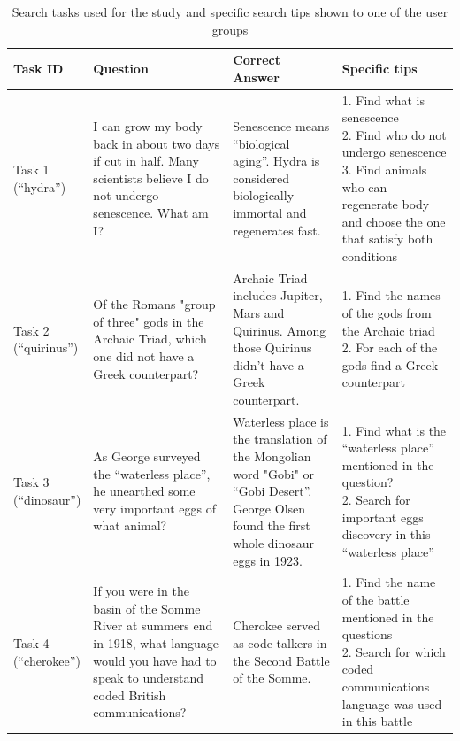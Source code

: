\documentclass{sig-alternate}
\begin{document}
\begin{table}[tbh]
\centering
\caption{Search tasks used for the study and specific search tips shown to one of the user groups}
\label{table:tasks}
\begin{tabular}{|p{1.55cm}|p{4.5cm}|p{4.2cm}|p{6.0cm}|} \hline
Task ID & Question & Correct Answer & Specific tips \\ \hline
\parbox[t]{1cm}{Task 1\\(``hydra'')} & I can grow my body back in about two days if cut in half. Many scientists believe I do not undergo senescence. What am I? & Senescence means ``biological aging''. Hydra is considered biologically immortal and regenerates fast. & \parbox[t]{6cm}{
1. Find what is senescence\\
2. Find who do not undergo senescence\\
3. Find animals who can regenerate body and choose the one that satisfy both conditions} \\ \hline
\parbox[t]{1cm}{Task 2\\(``quirinus'')} & Of the Romans "group of three" gods in the Archaic Triad, which one did not have a Greek counterpart? & Archaic Triad includes Jupiter, Mars and Quirinus. Among those Quirinus didn't have a Greek counterpart. &
\parbox[t]{6cm}{
1. Find the names of the gods from the Archaic triad\\
2. For each of the gods find a Greek counterpart
}\\ \hline
\parbox[t]{1cm}{Task 3\\(``dinosaur'')} & As George surveyed the ``waterless place'', he unearthed some very important eggs of what animal? & Waterless place is the translation of the Mongolian word "Gobi" or ``Gobi Desert''. George Olsen found the first whole dinosaur eggs in 1923. & \parbox[t]{6cm}{
1. Find what is the ``waterless place'' mentioned in the question?\\
2. Search for important eggs discovery in this ``waterless place''}\\ \hline
\parbox[t]{1cm}{Task 4\\(``cherokee'')} & If you were in the basin of the Somme River at summers end in 1918, what language would you have had to speak to understand coded British communications? & Cherokee served as code talkers in the Second Battle of the Somme. & \parbox[t]{6cm}{
1. Find the name of the battle mentioned in the questions\\
2. Search for which coded communications language was used in this battle\\
} \\ \hline
\end{tabular}
\end{table}
\end{document}
